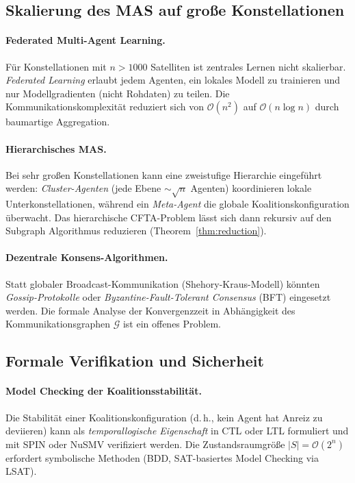 ﻿\documentclass[a4paper,12pt]{article}
\theoremstyle{definition}
\begin{document}
\subsection{Skalierung des MAS auf große Konstellationen}

\paragraph{Federated Multi-Agent Learning.}
F\"ur Konstellationen mit $n > 1000$ Satelliten ist zentrales Lernen
nicht skalierbar. \emph{Federated Learning} erlaubt jedem Agenten,
ein lokales Modell zu trainieren und nur Modellgradienten
(nicht Rohdaten) zu teilen.
Die Kommunikationskomplexit\"at reduziert sich von $\mathcal{O}(n^2)$
auf $\mathcal{O}(n \log n)$ durch baumartige Aggregation.

\paragraph{Hierarchisches MAS.}
Bei sehr gro\ss{}en Konstellationen kann eine zweistufige
Hierarchie eingef\"uhrt werden: \emph{Cluster-Agenten} (jede Ebene $\sim\sqrt{n}$ Agenten)
koordinieren lokale Unterkonstellationen, w\"ahrend ein
\emph{Meta-Agent} die globale Koalitionskonfiguration \"uberwacht.
Das hierarchische CFTA-Problem l\"asst sich dann rekursiv auf
den Subgraph Algorithmus reduzieren (Theorem~\ref{thm:reduction}).

\paragraph{Dezentrale Konsens-Algorithmen.}
Statt globaler Broadcast-Kommunikation (Shehory-Kraus-Modell)
k\"onnten \emph{Gossip-Protokolle} oder \emph{Byzantine-Fault-Tolerant
Consensus} (BFT) eingesetzt werden. Die formale Analyse der
Konvergenzzeit in Abh\"angigkeit des Kommunikationsgraphen
$\mathcal{G}$ ist ein offenes Problem.

\subsection{Formale Verifikation und Sicherheit}

\paragraph{Model Checking der Koalitionsstabilit\"at.}
Die Stabilit\"at einer Koalitionskonfiguration (d.\,h., kein Agent hat
Anreiz zu deviieren) kann als \emph{temporallogische Eigenschaft}
in CTL oder LTL formuliert und mit SPIN oder NuSMV verifiziert werden.
Die Zustandsraumgr\"o\ss{}e $|S| = \mathcal{O}(2^n)$ erfordert symbolische
Methoden (BDD, SAT-basiertes Model Checking via LSAT).
\end{document}
